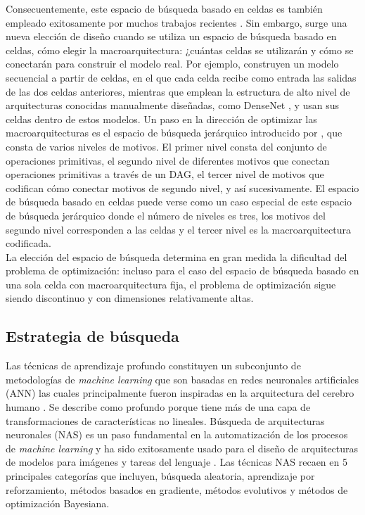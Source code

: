 Consecuentemente, este espacio de búsqueda basado en celdas es también empleado exitosamente por muchos trabajos recientes \parencite{68, 37, 62, 67, 69}. Sin embargo, surge una nueva elección de diseño cuando se utiliza un espacio de búsqueda basado en celdas, cómo elegir la macroarquitectura: ¿cuántas celdas se utilizarán y cómo se conectarán para construir el modelo real. Por ejemplo, \parencite{56} construyen un modelo secuencial a partir de celdas, en el que cada celda recibe como entrada las salidas de las dos celdas anteriores, mientras que \parencite{69} emplean la estructura de alto nivel de arquitecturas conocidas manualmente diseñadas, como DenseNet \parencite{70}, y usan sus celdas dentro de estos modelos. Un paso en la dirección de optimizar las macroarquitecturas es el espacio de búsqueda jerárquico introducido por \parencite{38}, que consta de varios niveles de motivos. El primer nivel consta del conjunto de operaciones primitivas, el segundo nivel de diferentes motivos que conectan operaciones primitivas a través de un DAG, el tercer nivel de motivos que codifican cómo conectar motivos de segundo nivel, y así sucesivamente. El espacio de búsqueda basado en celdas puede verse como un caso especial de este espacio de búsqueda jerárquico donde el número de niveles es tres, los motivos del segundo nivel corresponden a las celdas y el tercer nivel es la macroarquitectura codificada. \\
La elección del espacio de búsqueda determina en gran medida la dificultad del problema de optimización: incluso para el caso del espacio de búsqueda basado en una sola celda con macroarquitectura fija, el problema de optimización sigue siendo discontinuo y con dimensiones relativamente altas.


\subsection{Estrategia de búsqueda}

Las técnicas de aprendizaje profundo constituyen un subconjunto de metodologías de \textit{machine learning} que son basadas en redes neuronales artificiales (ANN) las cuales principalmente fueron inspiradas en la arquitectura del cerebro humano \parencite{34}. Se describe como profundo porque tiene más de una capa de transformaciones de características no lineales. Búsqueda de arquitecturas neuronales (NAS) es un paso fundamental en la automatización de los procesos de \textit{machine learning} y ha sido exitosamente usado para el diseño de arquitecturas de modelos para imágenes y tareas del lenguaje \parencite{35} \parencite{36} \parencite{37} \parencite{38} \parencite{39}. Las técnicas NAS recaen en 5 principales categorías que incluyen, búsqueda aleatoria, aprendizaje por reforzamiento, métodos basados en gradiente, métodos evolutivos y métodos de optimización Bayesiana.

